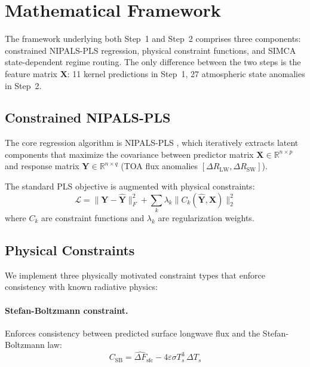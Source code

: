 \documentclass[11pt]{article}
\begin{document}
\section{Mathematical Framework}
\label{sec:framework}

The framework underlying both Step~1 and Step~2 comprises three
components: constrained NIPALS-PLS regression, physical
constraint functions, and SIMCA state-dependent regime routing.
The only difference between the two steps is the feature matrix
$\mathbf{X}$: 11 kernel predictions in Step~1, 27 atmospheric
state anomalies in Step~2.

\subsection{Constrained NIPALS-PLS}
\label{sec:pls}

The core regression algorithm is NIPALS-PLS
\citep{Wold2001,Tenenhaus1998}, which iteratively extracts latent
components that maximize the covariance between predictor matrix
$\mathbf{X} \in \mathbb{R}^{n \times p}$ and response matrix
$\mathbf{Y} \in \mathbb{R}^{n \times q}$ (TOA flux anomalies
$[\Delta R_\text{LW}, \Delta R_\text{SW}]$).

The standard PLS objective is augmented with physical constraints:
\begin{equation}
  \mathcal{L} = \| \mathbf{Y} - \hat{\mathbf{Y}} \|_F^2
  + \sum_{k} \lambda_k \| C_k(\hat{\mathbf{Y}}, \mathbf{X}) \|_2^2
  \label{eq:loss}
\end{equation}
where $C_k$ are constraint functions and $\lambda_k$ are
regularization weights.

\subsection{Physical Constraints}
\label{sec:constraints}

We implement three physically motivated constraint types that
enforce consistency with known radiative physics:

\paragraph{Stefan-Boltzmann constraint.} Enforces consistency
between predicted surface longwave flux and the Stefan-Boltzmann
law:
\begin{equation}
  C_\text{SB} = \hat{\Delta F}_\text{sfc}
  - 4 \varepsilon \sigma T_s^3 \, \Delta T_s
  \label{eq:sb}
\end{equation}
\end{document}
